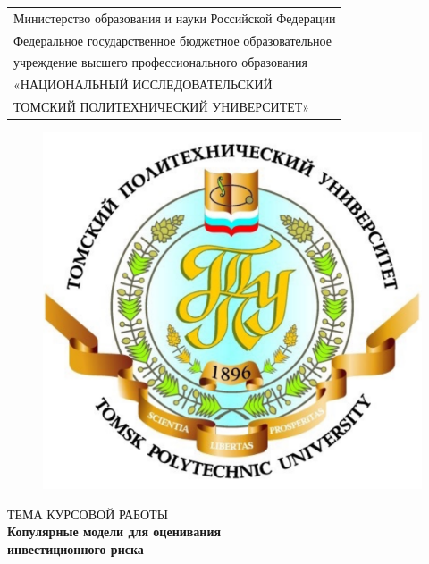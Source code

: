 \begin{titlepage}

\begin{table}[t]
    \centering
    \begin{tabularx}{\textwidth}{>{\setlength{\hsize}{\hsize}}Y}
        Министерство образования и науки Российской Федерации \\
        Федеральное государственное бюджетное образовательное \\ 
        учреждение высшего профессионального образования \\
        «НАЦИОНАЛЬНЫЙ ИССЛЕДОВАТЕЛЬСКИЙ \\
        ТОМСКИЙ ПОЛИТЕХНИЧЕСКИЙ УНИВЕРСИТЕТ» \\
        \hline
    \end{tabularx}
\end{table}

\begin{figure}[h]
\centering
\includegraphics[width=0.2\textheight]{images/oldlogo.pdf}
\end{figure}

\begin{center}
ТЕМА КУРСОВОЙ РАБОТЫ\\
\large{\textbf{Копулярные модели для оценивания\\инвестиционного риска}}
\end{center}


\end{titlepage}
